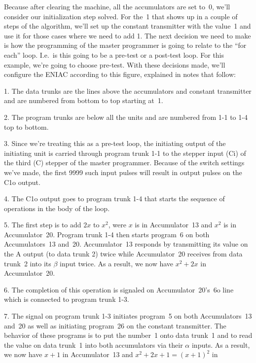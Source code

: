 Because after clearing the machine, all the accumulators are set to~0,
we'll consider our initialization step solved.
For the~1 that shows up in a couple of steps of the algorithm, we'll
set up the constant transmitter with the value~1 and use it for those
cases where we need to add 1.
The next decision we need to make is how the programming of the
master programmer is going to relate to the ``for each'' loop.
I.e.\ is this going to be a pre-test or a post-test loop.
For this example, we're going to choose pre-test.
With these decisions made, we'll configure the ENIAC according
to this figure, explained in notes that follow:
\medskip
\centerline{\epsfxsize=6.5in }
\medskip
{\advance\leftskip 20pt
\item{1.} The data trunks are the lines above the accumulators and
constant transmitter and are numbered from bottom to top starting
at~1.
\item{2.} The program trunks are below all the units and are numbered
from 1-1 to 1-4 top to bottom.
\item{3.} Since we're treating this as a pre-test loop, the initiating output
of the initiating unit is carried through program trunk 1-1 to the stepper
input (Ci) of the third (C) stepper of the master programmer.
Because of the switch settings we've made, the first 9999 such input
pulses will result in output pulses on the C1o output.
\item{4.} The C1o output goes to program trunk 1-4 that starts the sequence
of operations in the body of the loop.
\item{5.} The first step is to add $2x$ to $x^2$, were $x$ is in Accumulator~13 and
$x^2$ is in Accumulator~20.
Program trunk 1-4 then starts program~6 on both Accumulators~13 and~20.
Accumulator~13 responds by transmitting its value on the A output (to
data trunk 2) twice while
Accumulator~20 receives from data trunk~2 into its $\beta$ input twice.
As a result, we now have $x^2+2x$ in Accumulator~20.
\item{6.} The completion of this operation is signaled on Accumulator~20's~6o
line which is connected to program trunk 1-3.
\item{7.} The signal on program trunk 1-3 initiates program~5 on both
Accumulators~13 and~20 as well as initiating program~26 on the constant
transmitter.
The behavior of these programs is to put the number~1 onto data trunk~1
and to read the value on data trunk~1 into both accumulators via their $\alpha$
inputs.
As a result, we now have $x+1$ in Accumulator~13 and $x^2+2x+1=(x+1)^2$ in
}
